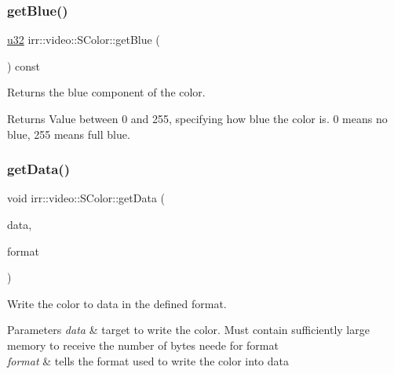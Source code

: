 \subsubsection{\texorpdfstring{get\+Blue()}{getBlue()}}
{\footnotesize\ttfamily \hyperlink{namespaceirr_a0416a53257075833e7002efd0a18e804}{u32} irr\+::video\+::\+S\+Color\+::get\+Blue (\begin{DoxyParamCaption}{ }\end{DoxyParamCaption}) const\hspace{0.3cm}{\ttfamily [inline]}}



Returns the blue component of the color. 

\begin{DoxyReturn}{Returns}
Value between 0 and 255, specifying how blue the color is. 0 means no blue, 255 means full blue. 
\end{DoxyReturn}
\mbox{\label{classirr_1_1video_1_1SColor_a7cba1b914230289de9c91ff28be96bc9}} 
\subsubsection{\texorpdfstring{get\+Data()}{getData()}}
{\footnotesize\ttfamily void irr\+::video\+::\+S\+Color\+::get\+Data (\begin{DoxyParamCaption}\item[{void $\ast$}]{data,  }\item[{\hyperlink{namespaceirr_1_1video_a1d5e487888c32b1674a8f75116d829ed}{E\+C\+O\+L\+O\+R\+\_\+\+F\+O\+R\+M\+AT}}]{format }\end{DoxyParamCaption})\hspace{0.3cm}{\ttfamily [inline]}}



Write the color to data in the defined format. 


\begin{DoxyParams}{Parameters}
{\em data} & target to write the color. Must contain sufficiently large memory to receive the number of bytes neede for format \\
\hline
{\em format} & tells the format used to write the color into data \\
\hline
\end{DoxyParams}
\mbox{\label{classirr_1_1video_1_1SColor_a198773366f2a5436c1ca4adc9037bb8d}} 
